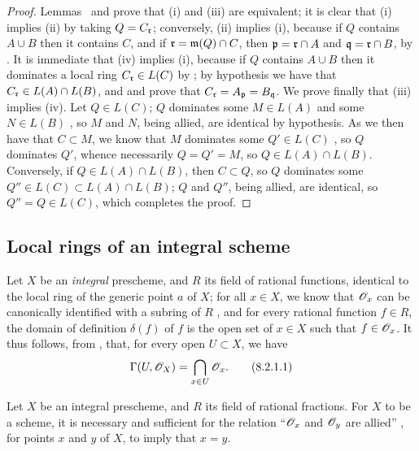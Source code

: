 \begin{proof}
\label{proof-1.8.1.5}
Lemmas~ and  prove that (i) and (iii) are equivalent;
it is clear that (i) implies (ii) by taking $Q=C_\mathfrak{r}$;
conversely, (ii) implies (i), because if $Q$ contains $A\cup B$ then it contains $C$, and if $\mathfrak{r}=\mathfrak{m}(Q)\cap C$, then $\mathfrak{p}=\mathfrak{r}\cap A$ and $\mathfrak{q}=\mathfrak{r}\cap B$, by .
It is immediate that (iv) implies (i), because if $Q$ contains $A\cup B$ then it dominates a local ring $C_\mathfrak{r}\in L(C)$ by ;
by hypothesis we have that $C_\mathfrak{r}\in L(A)\cap L(B)$, and  and  prove that $C_\mathfrak{r}=A_\mathfrak{p}=B_\mathfrak{q}$.
We prove finally that (iii) implies (iv).
Let $Q\in L(C)$;
$Q$ dominates some $M\in L(A)$ and some $N\in L(B)$ , so $M$ and $N$, being allied, are identical by hypothesis.
As we then have that $C\subset M$, we know that $M$ dominates some $Q'\in L(C)$ , so $Q$ dominates $Q'$, whence necessarily  $Q=Q'=M$, so $Q\in L(A)\cap L(B)$.
Conversely, if $Q\in L(A)\cap L(B)$, then $C\subset Q$, so  $Q$ dominates some $Q''\in L(C)\subset L(A)\cap L(B)$;
$Q$ and $Q''$, being allied, are identical, so $Q''=Q\in L(C)$, which completes the proof.
\end{proof}

\subsection{Local rings of an integral scheme}
\label{subsection-local-rings-of-integral-scheme}

\begin{env}[8.2.1]
\label{1.8.2.1}
Let $X$ be an \emph{integral} prescheme, and $R$ its field of rational functions, identical to the local ring of the generic point $a$ of $X$;
for all $x\in X$, we know that $\mathscr{O}_x$ can be canonically identified with a subring of $R$ , and for every rational function $f\in R$, the domain of definition $\delta(f)$ of $f$ is the open set of $x\in X$ such that
$f\in\mathscr{O}_x$.
It thus follows, from , that, for every open $U\subset X$, we have
\begin{equation*}
  \label{1.8.2.1.1}
  \Gamma(U,\mathscr{O}_X)=\bigcap_{x\in U}\mathscr{O}_x.
  \tag{8.2.1.1}
\end{equation*}
\end{env}

\begin{prop}[8.2.2]
\label{1.8.2.2}
Let $X$ be an integral prescheme, and $R$ its field of rational fractions. For $X$ to be a scheme, it is necessary and sufficient for the relation ``$\mathscr{O}_x$ and $\mathscr{O}_y$ are allied'' , for points $x$ and $y$ of $X$, to imply that $x=y$.
\end{prop}


